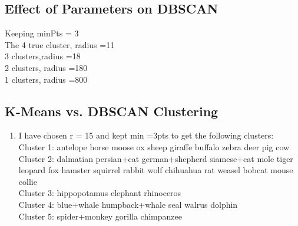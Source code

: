\documentclass{article}
\begin{document}
\subsection{Effect of Parameters on DBSCAN}

 Keeping minPts = 3 \\
 The 4 true cluster, radius =11\\
 3 clusters,radius =18\\
 2 clusters, radius =180\\
 1 clusters, radius =800\\

\subsection{K-Means vs. DBSCAN Clustering}
\begin{enumerate} 
\item I have chosen r = 15 and kept min =3pts to get the following clusters:\\
{Cluster 1: antelope horse moose ox sheep giraffe buffalo zebra deer pig cow \\
Cluster 2: dalmatian persian+cat german+shepherd siamese+cat mole tiger leopard fox hamster squirrel rabbit wolf chihuahua rat weasel bobcat mouse collie\\
Cluster 3: hippopotamus elephant rhinoceros\\
Cluster 4: blue+whale humpback+whale seal walrus dolphin\\
Cluster 5: spider+monkey gorilla chimpanzee}
\end{enumerate}
\end{document}
